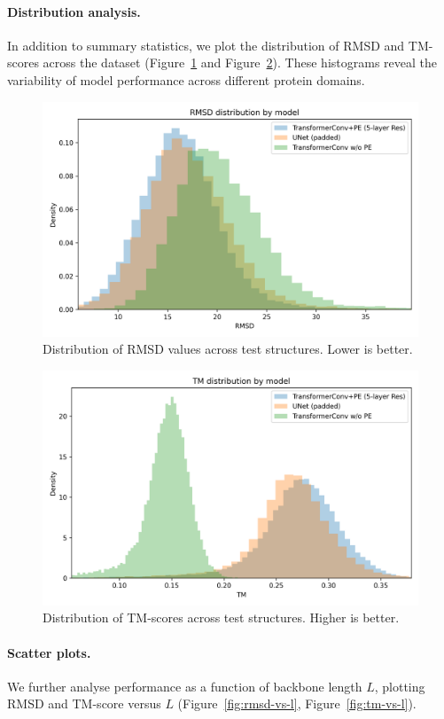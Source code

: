 \documentclass[a4paper,12pt]{article}
\begin{document}
\paragraph{Distribution analysis.}
In addition to summary statistics, we plot the distribution of RMSD and TM-scores across the dataset (Figure~\ref{fig:rmsd-hist} and Figure~\ref{fig:tm-hist}). 
These histograms reveal the variability of model performance across different protein domains.

\begin{figure}[htbp]
\centering
\includegraphics[width=0.7\linewidth]{rmsd_dist.png}
\caption{Distribution of RMSD values across test structures. Lower is better.}
\label{fig:rmsd-hist}
\end{figure}

\begin{figure}[htbp]
\centering
\includegraphics[width=0.7\linewidth]{tm_dist.png}
\caption{Distribution of TM-scores across test structures. Higher is better.}
\label{fig:tm-hist}
\end{figure}

\paragraph{Scatter plots.}
We further analyse performance as a function of backbone length \(L\), plotting RMSD and TM-score versus \(L\) (Figure~\ref{fig:rmsd-vs-l}, Figure~\ref{fig:tm-vs-l}).
\end{document}
